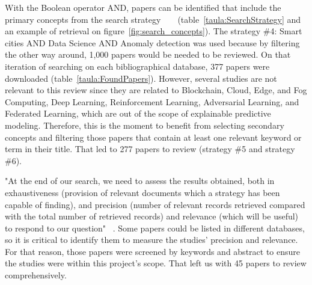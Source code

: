 \documentclass[a4paper,12pt,twoside]{ThesisStyle}
\begin{document}
With the Boolean operator AND, papers can be identified  that include the primary concepts from the search strategy  ~\cite{SearchStrategy2018} ~\cite{SystematicLiteratureReviewsEngineering2014} (table~\ref{taula:SearchStrategy} and an example of retrieval on figure~\ref{fig:search_concepts}). The strategy \#4: Smart cities AND Data Science AND Anomaly detection was used because by filtering the other way around, 1,000 papers would be needed to be reviewed. On that iteration of searching on each bibliographical database, 377 papers were downloaded (table~\ref{taula:FoundPapers}). However, several studies are not relevant to this review since they are related to Blockchain, Cloud, Edge, and Fog Computing, Deep Learning, Reinforcement Learning, Adversarial Learning, and Federated Learning, which are out of the scope of explainable predictive modeling. Therefore, this is the moment to benefit from selecting secondary concepts and filtering those papers that contain at least one relevant keyword or term in their title. That led to 277 papers to review (strategy \#5 and strategy \#6).

"At the end of our search, we need to assess the results obtained, both in exhaustiveness (provision of relevant documents which a strategy has been capable of finding), and precision (number of relevant records retrieved compared with the total number of retrieved records) and relevance (which will be useful) to respond to our question" ~\cite{SearchStrategy2018}. Some papers could be listed in different databases, so it is critical to identify them to measure the studies' precision and relevance. For that reason, those papers were screened by keywords and abstract to ensure the studies were within this project's scope. That left us with 45 papers to review comprehensively.
\end{document}
